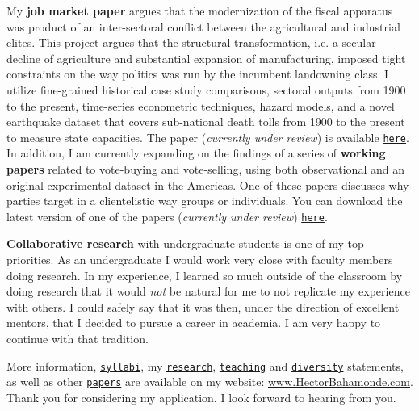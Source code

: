 \documentclass[10pt,stdletter,dateno,sigleft]{newlfm} %
\begin{document}
\begin{newlfm}
My {\bf job market paper} argues that the modernization of the fiscal apparatus was product of an inter-sectoral conflict between the agricultural and industrial elites. This project argues that the structural transformation, i.e. a secular decline of agriculture and substantial expansion of manufacturing, imposed tight constraints on the way politics was run by the incumbent landowning class. I utilize fine-grained historical case study comparisons, sectoral outputs from 1900 to the present, time-series econometric techniques, hazard models, and a novel earthquake dataset that covers sub-national death tolls from 1900 to the present to measure state capacities. The paper (\emph{currently under review}) is available \href{https://github.com/hbahamonde/IncomeTaxAdoption/raw/master/Bahamonde_IncomeTaxAdoption.pdf}{\texttt{here}}. In addition, I am currently expanding on the findings of a series of {\bf working papers} related to vote-buying and vote-selling, using both observational and an original experimental dataset in the Americas. One of these papers discusses why parties target in a clientelistic way groups or individuals. You can download the latest version of one of the papers (\emph{currently under review}) \href{https://github.com/hbahamonde/Clientelism_paper/raw/master/Bahamonde_Clientelism_Paper.pdf}{\texttt{here}}. 


{\bf Collaborative research} with undergraduate students is one of my top priorities. As an undergraduate I would work very close with faculty members doing research. In my experience, I learned so much outside of the classroom by doing research that it would \emph{not} be natural for me to not replicate my experience with others. I could safely say that it was then, under the direction of excellent mentors, that I decided to pursue a career in academia. I am very happy to continue with that tradition.


More information, \href{http://www.hectorbahamonde.com/teaching/
}{\texttt{syllabi}}, my \href{http://github.com/hbahamonde/Job_Market/raw/master/Bahamonde_Research_Statement.pdf}{\texttt{research}}, \href{http://github.com/hbahamonde/Job_Market/raw/master/Bahamonde_Teaching_Statement.pdf}{\texttt{teaching}} and \href{http://github.com/hbahamonde/Job_Market/raw/master/Bahamonde_Diversity_Statement.pdf}{\texttt{diversity}} statements, as well as other \href{http://www.hectorbahamonde.com/research/}{\texttt{papers}} are available on my website: \href{http://www.hectorbahamonde.com}{www.HectorBahamonde.com}. Thank you for considering my application. I look forward to hearing from you.






\end{newlfm}
\end{document}
